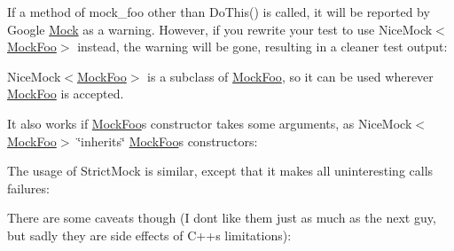 If a method of {\ttfamily mock\+\_\+foo} other than {\ttfamily Do\+This()} is called, it will be reported by Google \mbox{\hyperlink{classMock}{Mock}} as a warning. However, if you rewrite your test to use {\ttfamily Nice\+Mock$<$\mbox{\hyperlink{classMockFoo}{Mock\+Foo}}$>$} instead, the warning will be gone, resulting in a cleaner test output\+:


\begin{DoxyCode}{0}
\DoxyCodeLine{}
\DoxyCodeLine{\}}
\end{DoxyCode}


{\ttfamily Nice\+Mock$<$\mbox{\hyperlink{classMockFoo}{Mock\+Foo}}$>$} is a subclass of {\ttfamily \mbox{\hyperlink{classMockFoo}{Mock\+Foo}}}, so it can be used wherever {\ttfamily \mbox{\hyperlink{classMockFoo}{Mock\+Foo}}} is accepted.

It also works if {\ttfamily \mbox{\hyperlink{classMockFoo}{Mock\+Foo}}}\textquotesingle{}s constructor takes some arguments, as {\ttfamily Nice\+Mock$<$\mbox{\hyperlink{classMockFoo}{Mock\+Foo}}$>$} \char`\"{}inherits\char`\"{} {\ttfamily \mbox{\hyperlink{classMockFoo}{Mock\+Foo}}}\textquotesingle{}s constructors\+:


\begin{DoxyCode}{0}
\DoxyCodeLine{}
\DoxyCodeLine{\}}
\end{DoxyCode}


The usage of {\ttfamily Strict\+Mock} is similar, except that it makes all uninteresting calls failures\+:


\begin{DoxyCode}{0}
\DoxyCodeLine{}
\DoxyCodeLine{}
\DoxyCodeLine{\}}
\end{DoxyCode}


There are some caveats though (I don\textquotesingle{}t like them just as much as the next guy, but sadly they are side effects of C++\textquotesingle{}s limitations)\+:


